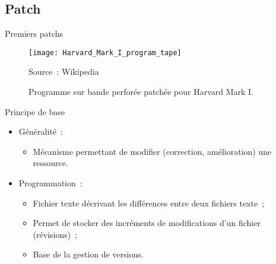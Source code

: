 \subsection{Patch}

\begin{frame}{Premiers patchs}
 \begin{figure}
   \caption{Programme sur bande perforée patchée pour Harvard Mark I.}
   \texttt{[image: Harvard\_Mark\_I\_program\_tape]}\par
   \tiny Source~: Wikipedia
 \end{figure}
\end{frame}

\begin{frame}[fragile]{Principe de base}
\begin{itemize}[<+->]
 \item Généralité~:
 \begin{itemize}
     \item Mécanisme permettant de modifier (correction, amélioration) une ressource.
  \end{itemize}
 \item Programmation~:
 \begin{itemize}[<+->]
    \item Fichier texte décrivant les différences entre deux fichiers texte~;
    \item Permet de stocker des incréments de modifications d'un fichier (révisions)~;
    \item Base de la gestion de versions.
  \end{itemize}
 \end{itemize}
\end{frame}

